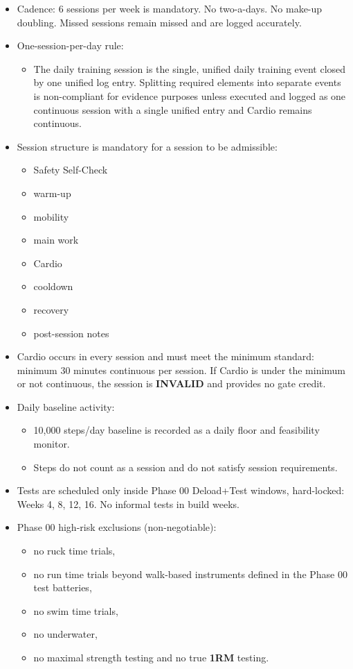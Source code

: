 \documentclass[10pt]{article}
\begin{document}
\begin{itemize}
\item Cadence: 6 sessions per week is mandatory. No two-a-days. No make-up doubling. Missed sessions remain missed and are logged accurately.

\item One-session-per-day rule:
  \begin{itemize}
  \item The daily training session is the single, unified daily training event closed by one unified log entry. Splitting required elements into separate events is non-compliant for evidence purposes unless executed and logged as one continuous session with a single unified entry and Cardio remains continuous.
  \end{itemize}

\item Session structure is mandatory for a session to be admissible:
  \begin{itemize}
  \item Safety Self-Check
  \item warm-up
  \item mobility
  \item main work
  \item Cardio
  \item cooldown
  \item recovery
  \item post-session notes
  \end{itemize}

\item Cardio occurs in every session and must meet the minimum standard: minimum 30 minutes continuous per session. If Cardio is under the minimum or not continuous, the session is \textbf{INVALID} and provides no gate credit.

\item Daily baseline activity:
  \begin{itemize}
  \item 10,000 steps/day baseline is recorded as a daily floor and feasibility monitor.
  \item Steps do not count as a session and do not satisfy session requirements.
  \end{itemize}

\item Tests are scheduled only inside Phase 00 Deload+Test windows, hard-locked: Weeks 4, 8, 12, 16. No informal tests in build weeks.

\item Phase 00 high-risk exclusions (non-negotiable):
  \begin{itemize}
  \item no ruck time trials,
  \item no run time trials beyond walk-based instruments defined in the Phase 00 test batteries,
  \item no swim time trials,
  \item no underwater,
  \item no maximal strength testing and no true \textbf{1RM} testing.
  \end{itemize}


\end{itemize}
\end{document}
